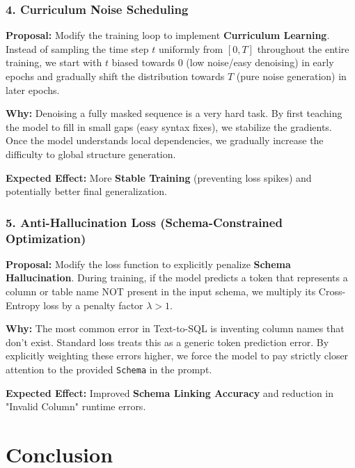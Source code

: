 \documentclass[a4paper,12pt]{article}
\begin{document}
\subsubsection*{4. Curriculum Noise Scheduling}

\textbf{Proposal:} Modify the training loop to implement \textbf{Curriculum Learning}. Instead of sampling the time step $t$ uniformly from $[0, T]$ throughout the entire training, we start with $t$ biased towards $0$ (low noise/easy denoising) in early epochs and gradually shift the distribution towards $T$ (pure noise generation) in later epochs.

\textbf{Why:} Denoising a fully masked sequence is a very hard task. By first teaching the model to fill in small gaps (easy syntax fixes), we stabilize the gradients. Once the model understands local dependencies, we gradually increase the difficulty to global structure generation.

\textbf{Expected Effect:} More \textbf{Stable Training} (preventing loss spikes) and potentially better final generalization.

\subsubsection*{5. Anti-Hallucination Loss (Schema-Constrained Optimization)}

\textbf{Proposal:} Modify the loss function to explicitly penalize \textbf{Schema Hallucination}. During training, if the model predicts a token that represents a column or table name NOT present in the input schema, we multiply its Cross-Entropy loss by a penalty factor $\lambda > 1$.

\textbf{Why:} The most common error in Text-to-SQL is inventing column names that don't exist. Standard loss treats this as a generic token prediction error. By explicitly weighting these errors higher, we force the model to pay strictly closer attention to the provided \texttt{Schema} in the prompt.

\textbf{Expected Effect:} Improved \textbf{Schema Linking Accuracy} and reduction in "Invalid Column" runtime errors.

\section{Conclusion}
\end{document}
